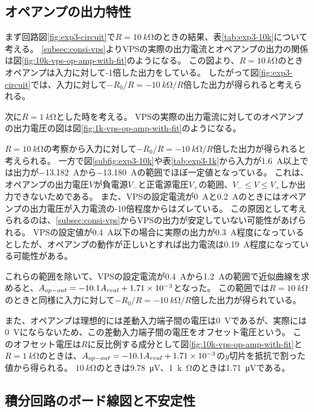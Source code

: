 \documentclass[../../../main]{subfiles}
\begin{document}
\subsection{オペアンプの出力特性}
まず回路図\ref{fig:exp3-circuit}で$R=\SI{10}{k\ohm}$のときの結果、表\ref{tab:exp3-10k}について考える。
\ref{subsec:consi-vps}よりVPSの実際の出力電流とオペアンプの出力の関係は図\ref{fig:10k-vps-op-amp-with-fit}のようになる。
この図より、$R=\SI{10}{k\ohm}$のときオペアンプは入力に対して-1倍した出力をしている。
したがって図\ref{fig:exp3-circuit}では、入力に対して$-R_0/R = -\SI{10}{k\ohm}/R$倍した出力が得られると考えられる。


次に$R=\SI{1}{k\ohm}$とした時を考える。
VPSの実際の出力電流に対してのオペアンプの出力電圧の図は図\ref{fig:1k-vps-op-amp-with-fit}のようになる。

$R=\SI{10}{k\ohm}$の考察から入力に対して$-R_0/R = -\SI{10}{k\ohm}/R$倍した出力が得られると考えられる。
一方で図\ref{subfig:exp3-10k}や表\ref{tab:exp3-1k}から入力が\SI{1.6}{A}以上では出力が\SI{-13.182}{A}から\SI{-13.180}{A}の範囲でほぼ一定値となっている。
これは、オペアンプの出力電圧$V$が負電源$V_{-}$と正電源電圧$V_{+}$の範囲、$V_- \leq V \leq V_+$しか出力できない\cite{Kossy_2024,renesas}ためである。
また、VPSの設定電流が\SI{0}{A}と\SI{0.2}{A}のときにはオペアンプの出力電圧が入力電流の-10倍程度からはズレている。
この原因として考えられるのは、\ref{subsec:consi-vps}からVPSの出力が安定していない可能性があげられる。
VPSの設定値が\SI{0.4}{A}以下の場合に実際の出力が\SI{0.3}{A}程度になっているとしたが、オペアンプの動作が正しいとすれば出力電流は\SI{0.19}{A}程度になっている可能性がある。

これらの範囲を除いて、VPSの設定電流が\SI{0.4}{A}から\SI{1.2}{A}の範囲で近似曲線を求めると、$A_{op-out}=-10.1A_{real}+\SI{1.71E-3}{}$となった。
この範囲では$R=\SI{10}{k\ohm}$のときと同様に入力に対して$-R_0/R = -\SI{10}{k\ohm}/R$倍した出力が得られている。

また、オペアンプは理想的には差動入力端子間の電圧は\SI{0}{V}であるが、実際には\SI{0}{V}にならないため、この差動入力端子間の電圧をオフセット電圧という。
このオフセット電圧は$R$に反比例する成分として図\ref{fig:10k-vps-op-amp-with-fit}と$R=\SI{1}{k\ohm}$のときは、$A_{op-out}=-10.1A_{real}+\SI{1.71E-3}{}$の$y$切片を抵抗で割った値から得られる。
$\SI{10}{k\ohm}$のときは\SI{9.78}{\micro V}、\SI{1}{k\ohm}のときは\SI{1.71}{\micro V}である。

\subsection{積分回路のボード線図と不安定性}
\end{document}
